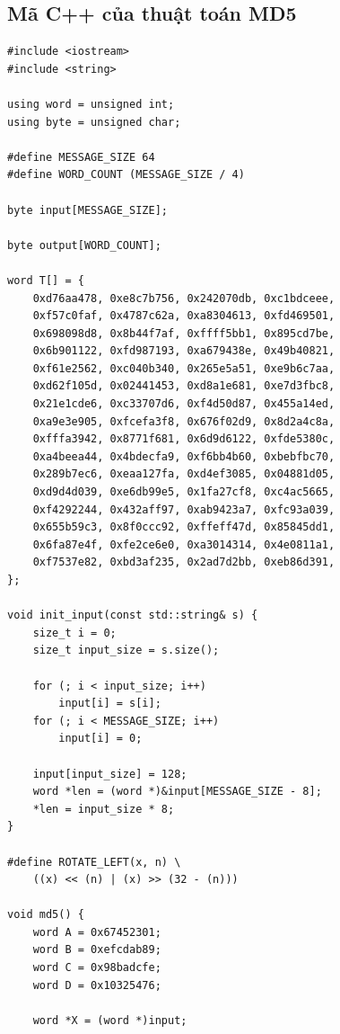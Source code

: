 \documentclass[../report.tex]{subfiles}
\begin{document}
\subsection{Mã C++ của thuật toán MD5}
\begin{lstlisting}
#include <iostream>
#include <string>

using word = unsigned int;
using byte = unsigned char;

#define MESSAGE_SIZE 64
#define WORD_COUNT (MESSAGE_SIZE / 4)

byte input[MESSAGE_SIZE];

byte output[WORD_COUNT];

word T[] = {
    0xd76aa478, 0xe8c7b756, 0x242070db, 0xc1bdceee,
    0xf57c0faf, 0x4787c62a, 0xa8304613, 0xfd469501,
    0x698098d8, 0x8b44f7af, 0xffff5bb1, 0x895cd7be,
    0x6b901122, 0xfd987193, 0xa679438e, 0x49b40821,
    0xf61e2562, 0xc040b340, 0x265e5a51, 0xe9b6c7aa,
    0xd62f105d, 0x02441453, 0xd8a1e681, 0xe7d3fbc8,
    0x21e1cde6, 0xc33707d6, 0xf4d50d87, 0x455a14ed,
    0xa9e3e905, 0xfcefa3f8, 0x676f02d9, 0x8d2a4c8a,
    0xfffa3942, 0x8771f681, 0x6d9d6122, 0xfde5380c,
    0xa4beea44, 0x4bdecfa9, 0xf6bb4b60, 0xbebfbc70,
    0x289b7ec6, 0xeaa127fa, 0xd4ef3085, 0x04881d05,
    0xd9d4d039, 0xe6db99e5, 0x1fa27cf8, 0xc4ac5665,
    0xf4292244, 0x432aff97, 0xab9423a7, 0xfc93a039,
    0x655b59c3, 0x8f0ccc92, 0xffeff47d, 0x85845dd1,
    0x6fa87e4f, 0xfe2ce6e0, 0xa3014314, 0x4e0811a1,
    0xf7537e82, 0xbd3af235, 0x2ad7d2bb, 0xeb86d391,
};

void init_input(const std::string& s) {
    size_t i = 0;
    size_t input_size = s.size();
    
    for (; i < input_size; i++)
        input[i] = s[i];
    for (; i < MESSAGE_SIZE; i++)
        input[i] = 0;
    
    input[input_size] = 128;
    word *len = (word *)&input[MESSAGE_SIZE - 8];
    *len = input_size * 8;
}

#define ROTATE_LEFT(x, n) \
    ((x) << (n) | (x) >> (32 - (n)))

void md5() {
    word A = 0x67452301;
    word B = 0xefcdab89;
    word C = 0x98badcfe;
    word D = 0x10325476;

    word *X = (word *)input;


\end{lstlisting}
\end{document}
